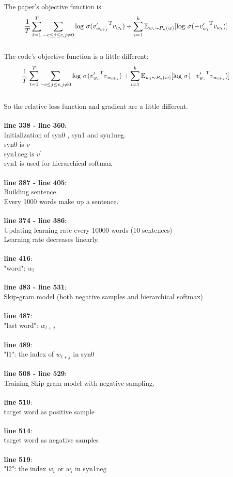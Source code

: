 \documentclass[12pt,a4paper,twoside]{book}
\begin{document}
The paper's objective function is:
 $$\frac{1}{T} \sum_{t=1}^{T} \sum_{-c\leq j\leq c, j\neq 0} \mathrm{log}\ \sigma({v^\prime_{w_{t+j}}}^{\mathrm{T}}v_{w_t})+\sum_{i=1}^k \mathbb{E}_{w_i\thicksim P_n(w)}[\mathrm{log}\ \sigma(-{v^\prime_{w_i}}^{\mathrm{T}}v_{w_t})]$$ 
\\
The code's objective function is a little different:
 $$\frac{1}{T} \sum_{t=1}^{T} \sum_{-c\leq j\leq c, j\neq 0} \mathrm{log}\ \sigma({v^\prime_{w_{t}}}^{\mathrm{T}}v_{w_{t+j}})+\sum_{i=1}^k \mathbb{E}_{w_i\thicksim P_n(w)}[\mathrm{log}\ \sigma(-{v^\prime_{w_i}}^{\mathrm{T}}v_{w_{t+j}})]$$ 
\\
So the relative loss function and gradient are a little different.
\\
\\
\textbf{line 338 - line 360}:\\
Initialization of syn0 , syn1 and syn1neg.  \\
syn0 is $v$\\
syn1neg is $v^\prime$\\
syn1 is used for hierarchical softmax\\
\\
\textbf{line 387 - line 405}:\\
Building sentence. \\
Every 1000 words make up a sentence.  \\
\\
\textbf{line 374 - line 386}:\\
Updating learning rate every 10000 words (10 sentences)\\
Learning rate decreases linearly. \\
\\
\textbf{line 416}:\\
"word": $w_t$  \\
\\
\textbf{line 483 - line 531}:\\
Skip-gram model (both negative samples and hierarchical softmax) \\
\\
    \textbf{line 487}: \\
        "last word": $w_{t+j}$\\
        \\
    \textbf{line 489}: \\
    		"l1": the index of $w_{t+j}$ in syn0  \\
    		\\
    \textbf{line 508 - line 529}:\\
        Training Skip-gram model with negative sampling. \\
        \\
	\textbf{line 510}: \\
		target word as positive sample \\
		\\
	\textbf{line 514}: \\
		target word as negative samples \\
		\\
	\textbf{line 519}: \\
		"l2": the index $w_t$ or $w_i$ in syn1neg \\
		
\end{document}
